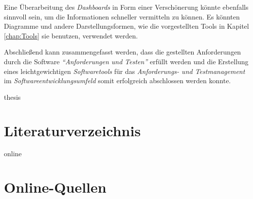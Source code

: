 \documentclass[11pt,a4paper]{report}
\begin{document}
Eine Überarbeitung des \textit{Dashboards} in Form einer Verschönerung könnte ebenfalls sinnvoll sein, um die Informationen schneller vermitteln zu können. Es könnten Diagramme und andere Darstellungsformen, wie die vorgestellten Tools in Kapitel \ref{chap:Tools} sie benutzen, verwendet werden.
 
 
Abschließend kann zusammengefasst werden, dass die gestellten Anforderungen durch die Software \textit{"`Anforderungen und Testen"'} erfüllt werden und die Erstellung eines leichtgewichtigen \textit{Softwaretools} für das \textit{Anforderungs- und Testmanagement} im \textit{Softwareentwicklungsumfeld} somit erfolgreich abschlossen werden konnte.



\newpage


\begin{btSect}{thesis} %
\section*{Literaturverzeichnis}
\btPrintCited
\end{btSect}
\begin{btSect}{online}
\section*{Online-Quellen}
\btPrintCited
\end{btSect}
\end{document}
